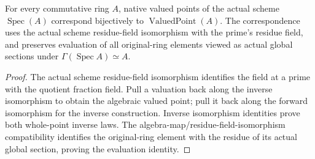 \begin{theorem}
\label{scheme:affine-valued-point-comparison}
\leanok
{}
For every commutative ring $A$, native valued points of the actual scheme
$\operatorname{Spec}(A)$ correspond bijectively to $\operatorname{ValuedPoint}(A)$.
The correspondence uses the actual scheme residue-field isomorphism with the
prime's residue field, and preserves evaluation of all original-ring elements
viewed as actual global sections under $\Gamma(\operatorname{Spec}A)\simeq A$.
\end{theorem}
\begin{proof}
The actual scheme residue-field isomorphism identifies the field at a prime
with the quotient fraction field. Pull a valuation back along the inverse
isomorphism to obtain the algebraic valued point; pull it back along the forward
isomorphism for the inverse construction. Inverse isomorphism identities prove
both whole-point inverse laws. The algebra-map/residue-field-isomorphism
compatibility identifies the original-ring element with the residue of its
actual global section, proving the evaluation identity.
\end{proof}

